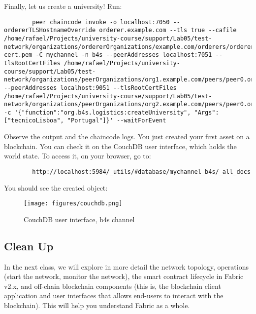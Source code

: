 \documentclass[12pt,a4paper]{article}
\theoremstyle{definition}
\begin{document}
    Finally, let us create a university! Run:
    \begin{verbatim}
        peer chaincode invoke -o localhost:7050 --ordererTLSHostnameOverride orderer.example.com --tls true --cafile /home/rafael/Projects/university-course/support/Lab05/test-network/organizations/ordererOrganizations/example.com/orderers/orderer.example.com/msp/tlscacerts/tlsca.example.com-cert.pem -C mychannel -n b4s --peerAddresses localhost:7051 --tlsRootCertFiles /home/rafael/Projects/university-course/support/Lab05/test-network/organizations/peerOrganizations/org1.example.com/peers/peer0.org1.example.com/tls/ca.crt --peerAddresses localhost:9051 --tlsRootCertFiles /home/rafael/Projects/university-course/support/Lab05/test-network/organizations/peerOrganizations/org2.example.com/peers/peer0.org2.example.com/tls/ca.crt -c '{"function":"org.b4s.logistics:createUniversity", "Args":["tecnicoLisboa", "Portugal"]}' --waitForEvent
    \end{verbatim}

    Observe the output and the chaincode logs.
    You just created your first asset on a blockchain. You can check it on the CouchDB user interface, which holds the world state. To access it, on your browser, go to:
    \begin{verbatim}
        http://localhost:5984/_utils/#database/mychannel_b4s/_all_docs
    \end{verbatim}

    You should see the created object:

    \begin{figure}[h]
        \centering
        \texttt{[image: figures/couchdb.png]}
        \caption{CouchDB user interface, b4s channel}
        \label{fig:cdb}
    \end{figure}

    \subsection{Clean Up}

    In the next class, we will explore in more detail the network topology, operations (start the network, monitor the network), the smart contract lifecycle in Fabric v2.x, and off-chain blockchain components (this is, the blockchain client application and user interfaces that allows end-users to interact with the blockchain). This will help you understand Fabric as a whole.
\end{document}
